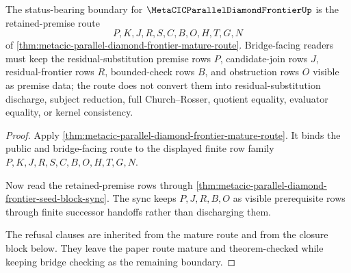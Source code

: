 \begin{theorem}
\label{thm:metacic-parallel-diamond-frontier-bridge-boundary}
The status-bearing boundary for $\MetaCICParallelDiamondFrontierUp$ is the retained-premise route
$$
P,K,J,R,S,C,B,O,H,T,G,N
$$
of \autoref{thm:metacic-parallel-diamond-frontier-mature-route}. Bridge-facing readers must keep the residual-substitution premise rows $P$, candidate-join rows $J$, residual-frontier rows $R$, bounded-check rows $B$, and obstruction rows $O$ visible as premise data; the route does not convert them into residual-substitution discharge, subject reduction, full Church--Rosser, quotient equality, evaluator equality, or kernel consistency.
\end{theorem}
\begin{proof}
Apply \autoref{thm:metacic-parallel-diamond-frontier-mature-route}. It binds the public and bridge-facing route to the displayed finite row family $P,K,J,R,S,C,B,O,H,T,G,N$.

Now read the retained-premise rows through \autoref{thm:metacic-parallel-diamond-frontier-seed-block-sync}. The sync keeps $P,J,R,B,O$ as visible prerequisite rows through finite successor handoffs rather than discharging them.

The refusal clauses are inherited from the mature route and from the closure block below. They leave the paper route mature and theorem-checked while keeping bridge checking as the remaining boundary.
\end{proof}

